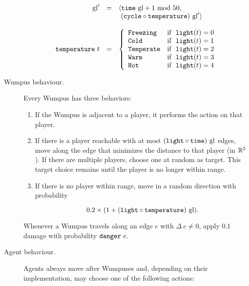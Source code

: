 \begin{definition}
\begin{description}
	$$
		\begin{array}{r c l}
			\mathrm{gl}' & = & \langle \mathtt{time}\ \mathrm{gl} + 1\ \mathrm{mod}\ 50,\\
					   &   &       \ (\mathtt{cycle} \circ \mathtt{temperature})\ \mathrm{gl}' \rangle\\
			\\
			\mathtt{temperature}\ t & = &
			\left\{
				\begin{array}{l l}
					\mathtt{Freezing} & \textnormal{if }\ \mathtt{light}(t) = 0\\
					\mathtt{Cold} & \textnormal{if }\ \mathtt{light}(t) = 1\\
					\mathtt{Temperate} & \textnormal{if }\ \mathtt{light}(t) = 2\\
					\mathtt{Warm} & \textnormal{if }\ \mathtt{light}(t) = 3\\
					\mathtt{Hot} & \textnormal{if }\ \mathtt{light}(t) = 4
				\end{array}
			\right.\\
		\end{array}
	$$
	
	\item[Wumpus behaviour.] Every Wumpus has three behaviors:
	
	\begin{enumerate}
		\item If the Wumpus is adjacent to a player, it performs the  action on that player.
		
		\item If there is a player reachable with at most $(\field{light} \circ \field{time})\ \mathrm{gl}$ edges, move along the edge that minimizes the distance to that player (in $\mathbb{R}^2$). If there are multiple players, choose one at random as target. This target choice remains until the player is no longer within range.
		
		\item If there is no player within range, move in a random direction with probability
		
		$$
			0.2 \times (1 + (\mathtt{light} \circ \mathtt{temperature})\ \mathrm{gl}).
		$$
	\end{enumerate}
	
	Whenever a Wumpus travels along an edge $e$ with $\Delta\ e \neq 0$, apply $0.1$ damage with probability $\field{danger}\ e$.
	
	\item[Agent behaviour.] Agents always move after Wumpuses and, depending on their implementation, may choose one of the following actions:
	

\end{description}
\end{definition}
